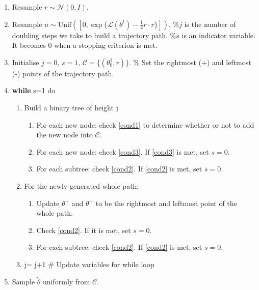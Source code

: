 \documentclass{article}
\begin{document}
\begin{enumerate}
\item Resample $r\sim\mathcal{N}(0,I)$.
\item Resample $u\sim\text{Unif}([0,\exp\{\mathcal{L}(\theta^t)-\frac{1}{2}r\cdot r\}])$.
$\%j$ is the number of doubling steps we take to build a trajectory path.
$\%s$ is an indicator variable. It becomes 0 when a stopping criterion is met.
\item Initialise $j=0$, $s=1$, $\mathcal{C}=\{(\theta_0^1,r)\}$. $\%$ Set the rightmost (+) and leftmost (-) points of the trajectory path.
\item \textbf{while} s=1 do
\begin{enumerate}
\item Build a binary tree of height j
\begin{enumerate}
\item For each new node: check \eqref{cond1} to determine whether or not to add the new node into $\mathcal{C}$.
\item For each new node: check \eqref{cond3}. If \eqref{cond3} is met, set $s=0$.
\item For each subtree: check \eqref{cond2}. If \eqref{cond2} is met, set $s=0$.
\end{enumerate}
\item For the newly generated whole path:
\begin{enumerate}
\item Update $\theta^{+}$ and $\theta^{-}$ to be the rightmost and leftmost point of the whole path.
\item Check \eqref{cond2}. If it is met, set $s=0$.
\item For each subtree: check \eqref{cond2}. If \eqref{cond2} is met, set $s=0$.
\end{enumerate}
\item  j= j+1 $\#$ Update variables for while loop
\end{enumerate}
\item Sample $\tilde{\theta}$ uniformly from $\mathcal{C}$.
\end{enumerate}
\end{document}
